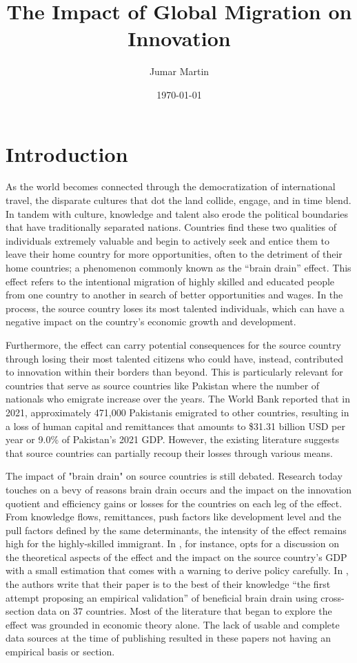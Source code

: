 \documentclass[12pt]{article}
\title{The Impact of Global Migration on Innovation}
\author{Jumar Martin}
\date{\today}
\begin{document}
\maketitle
\section{Introduction}
As the world becomes connected through the democratization of international travel, the disparate cultures that dot the land collide, engage, and in time blend.
In tandem with culture, knowledge and talent also erode the political boundaries that have traditionally separated nations.
Countries find these two qualities of individuals extremely valuable and begin to actively seek and entice them to leave their home country for more opportunities, often to the detriment of their home countries; a phenomenon commonly known as the “brain drain” effect.
This effect refers to the intentional migration of highly skilled and educated people from one country to another in search of better opportunities and wages.
In the process, the source country loses its most talented individuals, which can have a negative impact on the country's economic growth and development.

Furthermore, the effect can carry potential consequences for the source country through losing their most talented citizens who could have, instead, contributed to innovation within their borders than beyond.
This is particularly relevant for countries that serve as source countries like Pakistan where the number of nationals who emigrate increase over the years.
The World Bank reported that in 2021, approximately 471,000 Pakistanis emigrated to other countries, resulting in a loss of human capital and remittances that amounts to \$31.31 billion USD per year or 9.0\% of Pakistan's 2021 GDP.
However, the existing literature suggests that source countries can partially recoup their losses through various means.

The impact of "brain drain" on source countries is still debated.
Research today touches on a bevy of reasons brain drain occurs and the impact on the innovation quotient and efficiency gains or losses for the countries on each leg of the effect.
From knowledge flows, remittances, push factors like development level and the pull factors defined by the same determinants, the intensity of the effect remains high for the highly-skilled immigrant.
In \cite{hall_brain_2005}, for instance, opts for a discussion on the theoretical aspects of the effect and the impact on the source country's GDP with a small estimation that comes with a warning to derive policy carefully.
In \citeauthor{beine_brain_2001}, the authors write that their paper is to the best of their knowledge ``the first attempt proposing an empirical validation'' of beneficial brain drain using cross-section data on 37 countries.
Most of the literature that began to explore the effect was grounded in economic theory alone.
The lack of usable and complete data sources at the time of publishing resulted in these papers not having an empirical basis or section.
\end{document}
